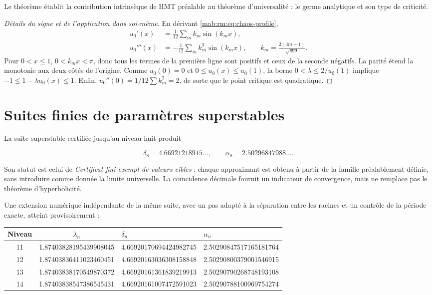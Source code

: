 Le théorème établit la contribution intrinsèque de HMT préalable au théorème
d’universalité : le germe analytique et son type de criticité.

\begin{proof}[Détails du signe et de l’application dans soi-même]
En dérivant \cref{mab:rm:eq:chaos-profile},
\begin{align*}
u_0'(x)&=\frac1{12}\sum_m k_m\sin(k_mx),\\
u_0'''(x)&=-\frac1{12}\sum_m k_m^3\sin(k_mx),
\qquad k_m=\frac{2(3m-1)}{\sqrt{899}}.
\end{align*}
Pour \(0<x\le1\), \(0<k_mx<\pi\), donc tous les termes de la première
ligne sont positifs et ceux de la seconde négatifs. La parité étend la
monotonie aux deux côtés de l’origine. Comme \(u_0(0)=0\) et
\(0\le u_0(x)\le u_0(1)\), la borne
\(0<\lambda\le2/u_0(1)\) implique
\(-1\le1-\lambda u_0(x)\le1\). Enfin,
\(u_0''(0)=1/12\sum k_m^2=2\), de sorte que le point critique est
quadratique.
\end{proof}

\section{Suites finies de paramètres superstables}

La suite superstable certifiée jusqu’au niveau huit produit

\[
\delta_8=4.66921218915\ldots,
\qquad
\alpha_8=2.50296847988\ldots.
\]

Son statut est celui de \emph{Certificat fini exempt de valeurs cibles} : chaque
approximant est obtenu à partir de la famille préalablement définie, sans introduire
comme donnée la limite universelle. La coïncidence décimale fournit un
indicateur de convergence, mais ne remplace pas le théorème d’hyperbolicité.

Une extension numérique indépendante de la même suite, avec un pas
adapté à la séparation entre les racines et un contrôle de la période exacte,
atteint provisoirement :

\begin{center}
\small
\begin{tabular}{@{}ccll@{}}
\toprule
Niveau & \(\lambda_n\) & \(\delta_n\) & \(\alpha_n\)\\
\midrule
11 & 1.87403828195439908045 & 4.66920170694424982745 & 2.50290847517165181764\\
12 & 1.87403836411023460451 & 4.66920163036308158848 & 2.50290800379001546915\\
13 & 1.87403838170549870372 & 4.66920161361839219913 & 2.50290790268748193108\\
14 & 1.87403838547386545431 & 4.66920161007472591023 & 2.50290788100969754274\\
\bottomrule
\end{tabular}
\end{center}

